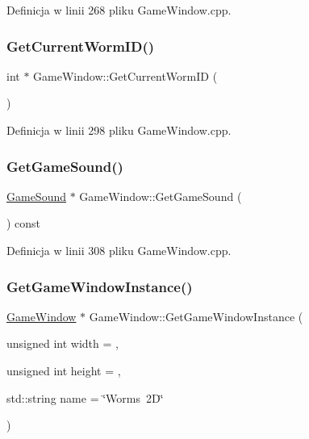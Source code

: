 Definicja w linii 268 pliku Game\+Window.\+cpp.

\mbox{\label{class_game_window_a6dbc377a22fff8ab01f30b10337dc5ae}} 
\subsubsection{\texorpdfstring{Get\+Current\+Worm\+I\+D()}{GetCurrentWormID()}}
{\footnotesize\ttfamily int $\ast$ Game\+Window\+::\+Get\+Current\+Worm\+ID (\begin{DoxyParamCaption}{ }\end{DoxyParamCaption})}



Definicja w linii 298 pliku Game\+Window.\+cpp.

\mbox{\label{class_game_window_aa3280056f0018da1eee85ccb1e5fd2ac}} 
\subsubsection{\texorpdfstring{Get\+Game\+Sound()}{GetGameSound()}}
{\footnotesize\ttfamily \mbox{\hyperlink{class_game_sound}{Game\+Sound}} $\ast$ Game\+Window\+::\+Get\+Game\+Sound (\begin{DoxyParamCaption}{ }\end{DoxyParamCaption}) const}



Definicja w linii 308 pliku Game\+Window.\+cpp.

\mbox{\label{class_game_window_a9c480a3795bfd6d22a9dc8a3bae47b1b}} 
\subsubsection{\texorpdfstring{Get\+Game\+Window\+Instance()}{GetGameWindowInstance()}}
{\footnotesize\ttfamily \mbox{\hyperlink{class_game_window}{Game\+Window}} $\ast$ Game\+Window\+::\+Get\+Game\+Window\+Instance (\begin{DoxyParamCaption}\item[{unsigned int}]{width = {},  }\item[{unsigned int}]{height = {},  }\item[{std\+::string}]{name = {\ttfamily \char`\"{}Worms~2D\char`\"{}} }\end{DoxyParamCaption})\hspace{0.3cm}{\ttfamily [static]}}



